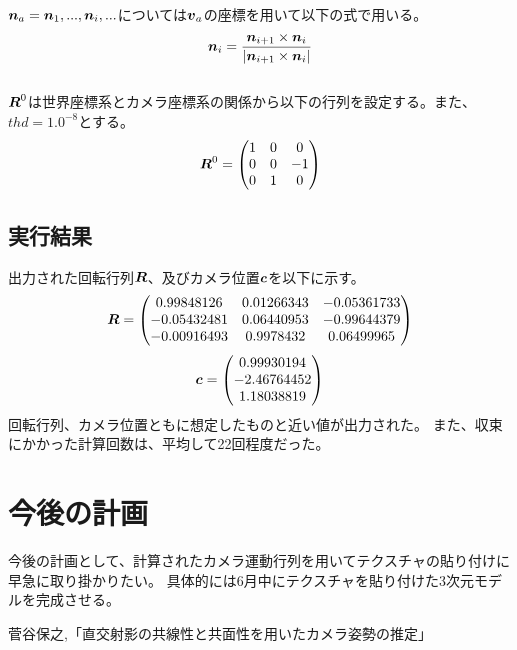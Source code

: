 \documentclass[]{jarticle}          %
\begin{document}
$\mbox{\boldmath $n$}_a={\mbox{\boldmath $n$}_1,...,\mbox{\boldmath $n$}_i,...}$については$\mbox{\boldmath $v$}_a$の座標を用いて以下の式で用いる。
\begin{equation}
  \mbox{\boldmath $n$}_i = \frac{\mbox{\boldmath $n$}_{i+1}\times{\mbox{\boldmath $n$}_{i}}}{|\mbox{\boldmath $n$}_{i+1}\times{\mbox{\boldmath $n$}_{i}}|}
\end{equation}
\\
$\mbox{\boldmath $R$}^0$は世界座標系とカメラ座標系の関係から以下の行列を設定する。また、$thd=1.0^{-8}$とする。
\begin{equation}
  \mbox{\boldmath $R$}^0 = 
  \begin{pmatrix}
    1 & 0 & 0 \\
    0 & 0 & -1 \\
    0 & 1 & 0 \\
  \end{pmatrix}
\end{equation}
\subsection{実行結果}
出力された回転行列$\mbox{\boldmath $R$}$、及びカメラ位置$\mbox{\boldmath $c$}$を以下に示す。
\begin{equation}
  \mbox{\boldmath $R$} =
  \begin{pmatrix}
    0.99848126 & 0.01266343 & -0.05361733 \\
    -0.05432481 &  0.06440953 & -0.99644379 \\
    -0.00916493 & 0.9978432 & 0.06499965 \\
  \end{pmatrix}
\end{equation}
\begin{equation}
  \mbox{\boldmath $c$} =
  \begin{pmatrix}
    0.99930194 \\
    -2.46764452 \\
    1.18038819 \\
  \end{pmatrix}
\end{equation}
回転行列、カメラ位置ともに想定したものと近い値が出力された。
また、収束にかかった計算回数は、平均して22回程度だった。

\section{今後の計画}
今後の計画として、計算されたカメラ運動行列を用いてテクスチャの貼り付けに早急に取り掛かりたい。
具体的には6月中にテクスチャを貼り付けた3次元モデルを完成させる。

\begin{thebibliography}{99}
 菅谷保之,「直交射影の共線性と共面性を用いたカメラ姿勢の推定」
\end{thebibliography}
\end{document}
